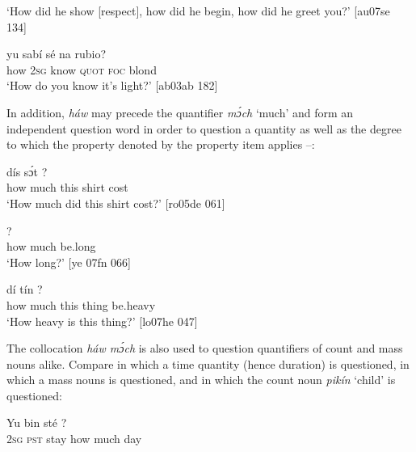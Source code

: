 \glt ‘How did he show [respect], how did he begin, how did he greet you?’ [au07se 134]
\z


\ea%
    \label{ex:key:632}
    \gll {}  yu  sabí    sé    na  rubio?\\
how    \textsc{2sg}  know  \textsc{quot}    \textsc{foc}  blond\\

\glt ‘How do you know it’s light?’ [ab03ab 182]
\z

In addition, \textit{háw} may precede the quantifier \textit{mɔ́ch} ‘much’ and form an independent question word in order to question a quantity  as well as the degree to which the property denoted by the property item applies –:


\ea%
    \label{ex:key:633}
    \gll {}    dís  sɔ́t    ?\\
how    much  this  shirt  cost\\

\glt ‘How much did this shirt cost?’ [ro05de 061]
\z


\ea%
    \label{ex:key:634}
    \gll {}    ?\\
how    much  be.long\\

\glt ‘How long?’ [ye 07fn 066]
\z


\ea%
    \label{ex:key:635}
    \gll {}    dí  tín    ?\\
how    much  this  thing  be.heavy\\

\glt ‘How heavy is this thing?’ [lo07he 047]
\z

The collocation \textit{háw mɔ́ch} is also used to question quantifiers of count and mass nouns alike. Compare  in which a time quantity (hence duration) is questioned,  in which a mass nouns is questioned, and  in which the count noun \textit{pikín} ‘child’ is questioned: 


\ea%
    \label{ex:key:636}
    \gll Yu  bin  sté          ?\\
\textsc{2sg}  \textsc{pst}  stay    how    much  day\\

